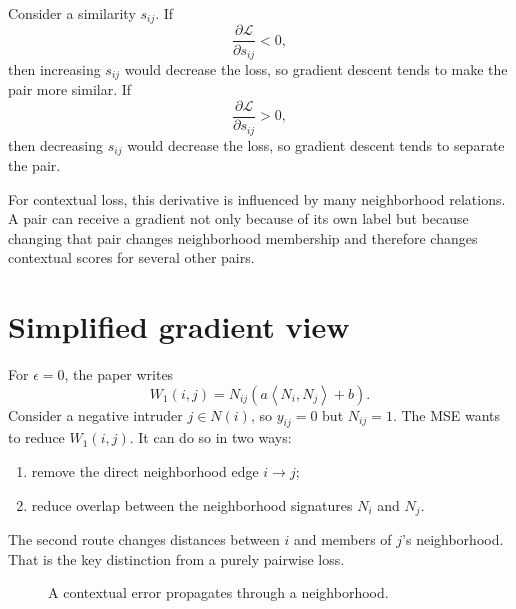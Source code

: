 \documentclass[11pt,oneside,openany]{book}
\theoremstyle{myplain}
\theoremstyle{definition}
\newcommand{\inner}[2]{\left\langle #1,#2\right\rangle}
\newcommand{\paperEq}[1]{\tag{P#1}}
\begin{document}
Consider a similarity $s_{ij}$. If
\[
  \frac{\partial\mathcal L}{\partial s_{ij}}<0,
\]
then increasing $s_{ij}$ would decrease the loss, so gradient descent tends to make the pair more similar. If
\[
  \frac{\partial\mathcal L}{\partial s_{ij}}>0,
\]
then decreasing $s_{ij}$ would decrease the loss, so gradient descent tends to separate the pair.

For contextual loss, this derivative is influenced by many neighborhood relations. A pair can receive a gradient not only because of its own label but because changing that pair changes neighborhood membership and therefore changes contextual scores for several other pairs.



\section{Simplified gradient view}

For $\epsilon=0$, the paper writes
\begin{equation*}
  W_1(i,j)=N_{ij}\left(a\inner{N_i}{N_j}+b\right).
\paperEq{8}
\label{eq:paper8}
\end{equation*}
Consider a negative intruder $j\in N(i)$, so $y_{ij}=0$ but $N_{ij}=1$. The MSE wants to reduce $W_1(i,j)$. It can do so in two ways:

\begin{enumerate}[leftmargin=*,itemsep=4pt]
  \item remove the direct neighborhood edge $i\to j$;
  \item reduce overlap between the neighborhood signatures $N_i$ and $N_j$.
\end{enumerate}
The second route changes distances between $i$ and members of $j$'s neighborhood. That is the key distinction from a purely pairwise loss.

\begin{figure}[H]
\centering
{}
\caption{A contextual error propagates through a neighborhood.}
\label{fig:context-gradient}
\end{figure}
\end{document}
